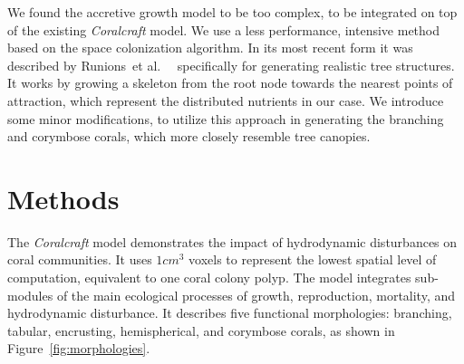 \documentclass[9pt]{pnas-new}
\renewcommand{\etal}{et al.\ }
\begin{document}
We found the accretive growth model to be too complex, to be integrated on top of the existing \textit{Coralcraft} model. We use a less performance, intensive method based on the space colonization algorithm. In its most recent form it was described by Runions~\etal~\cite{space_colonization_3d} specifically for generating realistic tree structures. It works by growing a skeleton from the root node towards the nearest points of attraction, which represent the distributed nutrients in our case. We introduce some minor modifications, to utilize this approach in generating the branching and corymbose corals, which more closely resemble tree canopies.

\section*{Methods}

The \textit{Coralcraft} model demonstrates the impact of hydrodynamic disturbances on coral communities. It uses $1cm^3$ voxels to represent the lowest spatial level of computation, equivalent to one coral colony polyp. The model integrates sub-modules of the main ecological processes of growth, reproduction, mortality, and hydrodynamic disturbance. It describes five functional morphologies: branching, tabular, encrusting, hemispherical, and corymbose corals, as shown in Figure~\ref{fig:morphologies}.
\end{document}
